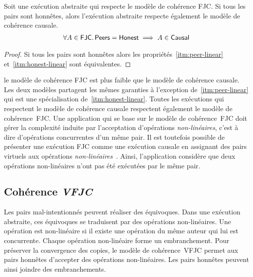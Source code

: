 \begin{proposition}\label{th:causal-fjc}
Soit une exécution abstraite qui respecte le modèle de cohérence \ac{FJC}.
Si tous les pairs sont honnêtes, alors l'exécution abstraite respecte également le modèle de cohérence causale.
\begin{equation*}\begin{split}
    \forall A \in \operatorname{\mathsf{FJC}} \ldotp \operatorname{\mathsf{Peers}} = \operatorname{\mathsf{Honest}} \implies A \in \operatorname{\mathsf{Causal}}
\end{split}\end{equation*}
\end{proposition}

\begin{proof}
Si tous les pairs sont honnêtes alors les propriétés~\ref{itm:peer-linear} et~\ref{itm:honest-linear} sont équivalentes.
\end{proof}

le modèle de cohérence \ac{FJC} est plus faible que le modèle de cohérence causale.
Les deux modèles partagent les mêmes garanties à l'exception de~\ref{itm:peer-linear} qui est une spécialisation de~\ref{itm:honest-linear}.
Toutes les exécutions qui respectent le modèle de cohérence causale respectent également le modèle de cohérence~\ac{FJC}.
Une application qui se base sur le modèle de cohérence~\ac{FJC} doit gérer la complexité induite par l'acceptation d'opérations \emph{non-linéaires}, c'est à dire d'opérations concurrentes d'un même pair.
Il est toutefois possible de présenter une exécution \ac{FJC} comme une exécution causale en assignant des pairs virtuels aux opérations \emph{non-linéaires}~\autocite{mahajan_depot_2011}.
Ainsi, l'application considère que deux opérations non-linéaires n'ont pas été exécutées par le même pair.

\subsection{Cohérence \emph{\acl{VFJC}}}

Les pairs mal-intentionnés peuvent réaliser des équivoques.
Dans une exécution abstraite, ces équivoques se traduisent par des opérations non-linéaires.
Une opération est non-linéaire si il existe une opération du même auteur qui lui est concurrente.
Chaque opération non-linéaire forme un embranchement.
Pour préserver la convergence des copies, le modèle de cohérence~\acf{VFJC} permet aux pairs honnêtes d'accepter des opérations non-linéaires.
Les pairs honnêtes peuvent ainsi joindre des embranchements.

